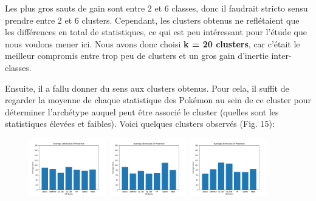 \documentclass[a4paper,12pt]{article}
\begin{document}
Les plus gros sauts de gain sont entre 2 et 6 classes, donc il faudrait stricto sensu prendre entre 2 et 6 clusters. Cependant, les clusters obtenus ne reflétaient que les différences en total de statistiques, ce qui est peu intéressant pour l'étude que nous voulons mener ici. Nous avons donc choisi \textbf{k = 20 clusters}, car c'était le meilleur compromis entre trop peu de clusters et un gros gain d'inertie inter-classes.

Ensuite, il a fallu donner du sens aux clusters obtenus. Pour cela, il suffit de regarder la moyenne de chaque statistique des Pokémon au sein de ce cluster pour déterminer l'archétype auquel peut être associé le cluster (quelles sont les statistiques élevées et faibles). Voici quelques clusters observés (Fig. 15):


\begin{figure}[!h]
    \centering

    \includegraphics[width=0.3\textwidth]{Clustering/stats_cluster/7_Balanced.png}
    \includegraphics[width=0.3\textwidth]{Clustering/stats_cluster/10_SweepAtk.png}
    \includegraphics[width=0.3\textwidth]{Clustering/stats_cluster/8_TankSpecial.png}

    \vspace{1em}  %


\end{figure}
\end{document}
